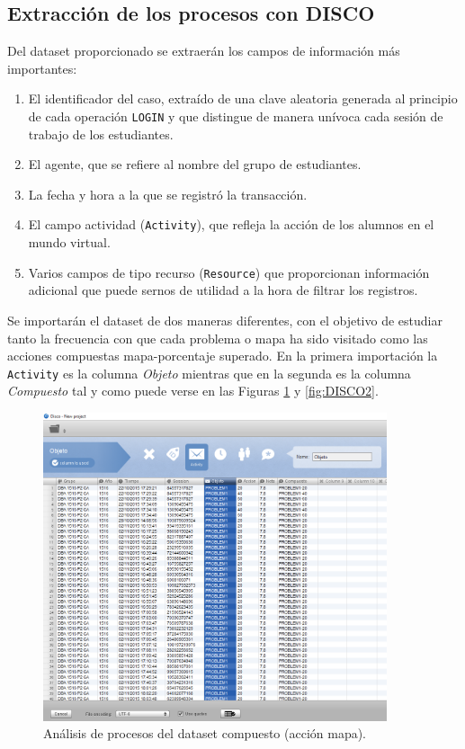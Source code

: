\subsection{Extracción de los procesos con DISCO}

Del dataset proporcionado se extraerán los campos de información más importantes:
\begin{enumerate}
\item El identificador del caso, extraído de una clave aleatoria generada al principio de cada operación \texttt{LOGIN} y que distingue de manera unívoca cada sesión de trabajo de los estudiantes.
\item El agente, que se refiere al nombre del grupo de estudiantes.
\item La fecha y hora a la que se registró la transacción.
\item El campo actividad (\texttt{Activity}), que refleja la acción de los alumnos en el mundo virtual.
\item Varios campos de tipo recurso (\texttt{Resource}) que proporcionan información adicional que puede sernos de utilidad a la hora de filtrar los registros.
\end{enumerate}

Se importarán el dataset de dos maneras diferentes, con el objetivo de estudiar tanto la frecuencia con que cada problema o mapa ha sido visitado como las acciones compuestas mapa-porcentaje superado. En la primera importación la \texttt{Activity} es la columna \emph{Objeto} mientras que en la segunda es la columna \emph{Compuesto} tal y como puede verse en las Figuras \ref{fig:DISCO1} y \ref{fig:DISCO2}.

\begin{figure}[H]
    \centering
    \includegraphics[width=0.90\textwidth]{imagenes/DISCO_map/DISCO_cut.png}
    \caption{Análisis de procesos del dataset compuesto (acción mapa).}
    \label{fig:DISCO1}
\end{figure}

